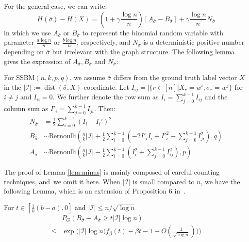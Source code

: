 \documentclass[entropy,article,accept,moreauthors,pdftex]{Definitions/mdpi}
\newcommand{\A}{\frac{a \log n}{n}}
\newcommand{\B}{\frac{b \log n}{n}}
\newcommand{\cI}{\mathcal{I}}
\newcommand{\1}{\mathbbm{1}}
\DeclareMathOperator{\Dist}{dist}
\begin{document}
\begin{paracol}{2}
For the general case, we can write:
\begin{equation}\label{eq:Hgeneral}
H(\bar{\sigma}) - H(X)=
(1 + \gamma \frac{ \log n}{n})[A_{\bar{\sigma}} - B_{\bar{\sigma}}] + \gamma\frac{ \log n}{n} N_{\bar{\sigma}}
\end{equation}
in which we use $A_{\bar{\sigma}}$ or $B_{\bar{\sigma}}$ to represent the binomial random variable with parameter $\A$ or $\B$,
respectively, and $N_{\bar{\sigma}}$ is a deterministic positive number depending on $\bar{\sigma}$ but irrelevant with the graph structure.
The following lemma gives the expression of $A_{\bar{\sigma}}, B_{\bar{\sigma}}$ and $N_{\bar{\sigma}}$:
\begin{Lemma}\label{lem:minus}
	For SSBM$(n,k,p,q)$, we assume $\bar{\sigma}$ differs from the ground truth label vector $X$ in the $|\cI|:=\Dist(\bar{\sigma}, X)$ coordinate.
	Let $I_{ij} = |\{r\in [n] | X_r = w^i, \sigma_r = w^j \}$ for $i\neq j$ and $I_{ii} = 0$. We further denote the row sum as $I_i = \sum_{j=0}^{k-1} I_{ij}$ and
	the column sum as $I'_i = \sum_{j=0}^{k-1} I_{ji}$.
	Then:
\begin{align}
	N_{\bar{\sigma}} &= \frac{1}{2}\sum_{i=0}^{k-1} (I_i - I_i')^2 \label{eq:N_w} \\
	B_{\bar{\sigma}} & \sim \textrm{Bernoulli}(\frac{n}{k}|\cI| + \frac{1}{2}\sum_{i=0}^{k-1}  (-2 I'_i I_i  + I'^2_i - \sum_{j=0}^{k-1} I^2_{ji}) , q)\\
	A_{\bar{\sigma}} & \sim \textrm{Bernoulli}(\frac{n}{k}|\cI| - \frac{1}{2}\sum_{i=0}^{k-1}  (I^2_i + \sum_{j=0}^{k-1} I^2_{ij}), p) \label{eq:A_w}
	\end{align}
\end{Lemma}
The proof of Lemma \ref{lem:minus} is mainly composed of careful counting techniques, and~we omit it here.
When $|\cI|$ is small compared to $n$, we have the following Lemma, which is an extension of Proposition 6 in~\cite{ye2020exact}. 
\begin{Lemma}\label{lem:enhanced_fb}
	For $t\in [\frac{1}{k}(b-a), 0]$
	and $ |\cI| \le n/\sqrt{\log n}$
\begin{equation} \label{eq:upmpt}
	\begin{aligned}
	& P_G(B_{\bar{\sigma}}-A_{\bar{\sigma}}\ge t |\cI| \log n)  \\
	\le & \exp\Big(|\cI|\log n
	\Big(f_{\beta}(t) - \beta t -1	+ O(\frac{1}{\sqrt{\log n}}) \Big)\Big)
	\end{aligned}
	\end{equation}

\end{Lemma}
\end{paracol}
\end{document}
